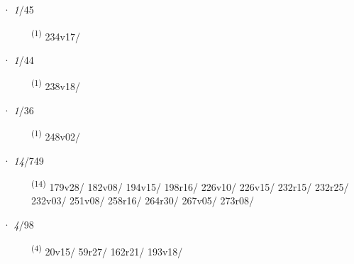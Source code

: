 \noindent{} · \textit{1}/45 \LEMMALINE
\begin{description}
    \item[]  \textsuperscript{(1)} \mbox{234v17/}
\end{description}
\ENTRYEND
\noindent{} · \textit{1}/44 \LEMMALINE
\begin{description}
    \item[]  \textsuperscript{(1)} \mbox{238v18/}
\end{description}
\ENTRYEND
\noindent{} · \textit{1}/36 \LEMMALINE
\begin{description}
    \item[]  \textsuperscript{(1)} \mbox{248v02/}
\end{description}
\ENTRYEND
\noindent{} · \textit{14}/749 \LEMMALINE
\begin{description}
    \item[]  \textsuperscript{(14)} \mbox{179v28/} \mbox{182v08/} \mbox{194v15/} \mbox{198r16/} \mbox{226v10/} \mbox{226v15/} \mbox{232r15/} \mbox{232r25/} \mbox{232v03/} \mbox{251v08/} \mbox{258r16/} \mbox{264r30/} \mbox{267v05/} \mbox{273r08/}
\end{description}
\ENTRYEND
\noindent{} · \textit{4}/98 \LEMMALINE
\begin{description}
    \item[]  \textsuperscript{(4)} \mbox{20v15/} \mbox{59r27/} \mbox{162r21/} \mbox{193v18/}
\end{description}
\ENTRYEND

